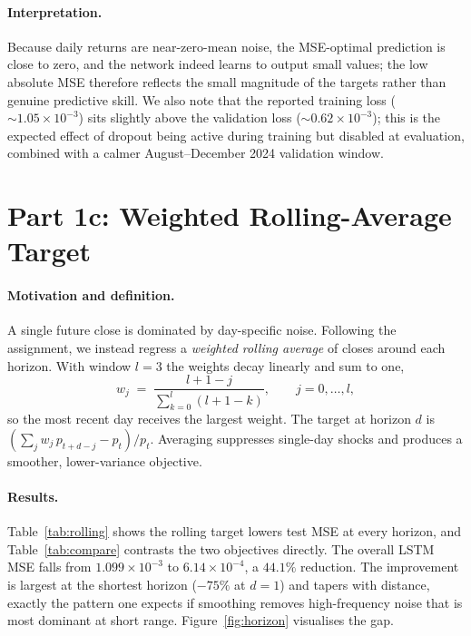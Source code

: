 \documentclass[10pt,twocolumn]{article}
\begin{document}
\paragraph{Interpretation.} Because daily returns are near-zero-mean noise, the
MSE-optimal prediction is close to zero, and the network indeed learns to output
small values; the low absolute MSE therefore reflects the small magnitude of the
targets rather than genuine predictive skill. We also note that the reported
training loss ($\sim\!1.05\times10^{-3}$) sits slightly above the validation loss
($\sim\!0.62\times10^{-3}$); this is the expected effect of dropout being active
during training but disabled at evaluation, combined with a calmer
August--December 2024 validation window.

\section{Part 1c: Weighted Rolling-Average Target}
\paragraph{Motivation and definition.} A single future close is dominated by
day-specific noise. Following the assignment, we instead regress a
\emph{weighted rolling average} of closes around each horizon. With window
$l{=}3$ the weights decay linearly and sum to one,
\[
w_j \;=\; \frac{l+1-j}{\sum_{k=0}^{l}(l+1-k)},\qquad j=0,\dots,l,
\]
so the most recent day receives the largest weight. The target at horizon $d$ is
$(\sum_j w_j\,p_{t+d-j}-p_t)/p_t$. Averaging suppresses single-day shocks and
produces a smoother, lower-variance objective.

\paragraph{Results.} Table~\ref{tab:rolling} shows the rolling target lowers test
MSE at every horizon, and Table~\ref{tab:compare} contrasts the two objectives
directly. The overall LSTM MSE falls from $1.099\times10^{-3}$ to
$6.14\times10^{-4}$, a $44.1\%$ reduction. The improvement is largest at the
shortest horizon ($-75\%$ at $d{=}1$) and tapers with distance, exactly the
pattern one expects if smoothing removes high-frequency noise that is most
dominant at short range. Figure~\ref{fig:horizon} visualises the gap.
\end{document}
